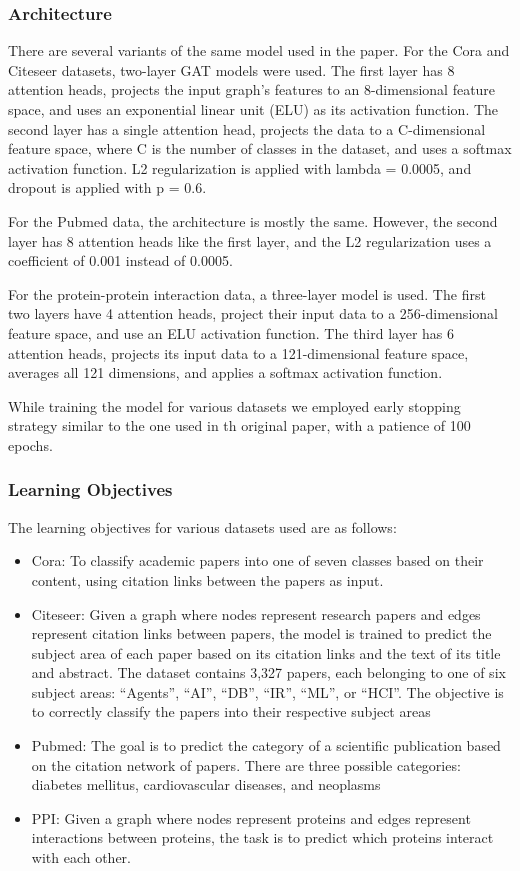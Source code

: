 \subsubsection{Architecture}
There are several variants of the same model used in the paper.
For the Cora and Citeseer datasets, two-layer GAT models were used.  The first
layer has 8 attention heads, projects the input graph's features to an
8-dimensional feature space, and uses an exponential linear unit (ELU) as its
activation function. The second layer has a single attention head, projects
the data to a C-dimensional feature space, where C is the number of classes in
the dataset, and uses a softmax activation function.  L2 regularization is
applied with lambda = 0.0005, and dropout is applied with p = 0.6.

For the Pubmed data, the architecture is mostly the same. However, the second
layer has 8 attention heads like the first layer, and the L2 regularization
uses a coefficient of 0.001 instead of 0.0005.

For the protein-protein interaction data, a three-layer model is used. The
first two layers have 4 attention heads, project their input data to a
256-dimensional feature space, and use an ELU activation function. The third
layer has 6 attention heads, projects its input data to a 121-dimensional
feature space, averages all 121 dimensions, and applies a softmax activation
function.

While training the model for various datasets we employed early stopping strategy similar to the one used in th
original paper, with a patience of 100 epochs.

\subsubsection{Learning Objectives}
The learning objectives for various datasets used are as follows:
\begin{itemize}
    \item Cora: To classify academic papers into one of seven classes based on their content, using citation links
    between the papers as input.
    \item Citeseer: Given a graph where nodes represent research papers and edges represent citation links between
    papers, the model is trained to predict the subject area of each paper based on its citation links and the text
    of its title and abstract.
    The dataset contains 3,327 papers, each belonging to one of six subject areas:
    ``Agents'', ``AI'', ``DB'', ``IR'', ``ML'', or ``HCI''.
    The objective is to correctly classify the papers into their respective subject areas
    \item Pubmed: The goal is to predict the category of a scientific publication based on the citation network of papers.
    There are three possible categories: diabetes mellitus, cardiovascular diseases, and neoplasms
    \item PPI: Given a graph where nodes represent proteins and edges represent interactions between proteins,
    the task is to predict which proteins interact with each other.
\end{itemize}
